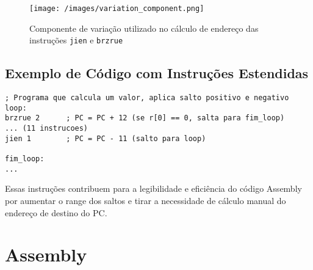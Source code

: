 \documentclass[12pt]{article}
\begin{document}
\begin{figure}[H]
\centering
\texttt{[image: /images/variation\_component.png]}
\caption{Componente de variação utilizado no cálculo de endereço das instruções \texttt{jien} e \texttt{brzrue}}
\label{fig:variation}
\end{figure}

\subsection{Exemplo de Código com Instruções Estendidas}

\begin{lstlisting}
; Programa que calcula um valor, aplica salto positivo e negativo
loop:
brzrue 2      ; PC = PC + 12 (se r[0] == 0, salta para fim_loop)
... (11 instrucoes)
jien 1        ; PC = PC - 11 (salto para loop)

fim_loop:
...
\end{lstlisting}

Essas instruções contribuem para a legibilidade e eficiência do código Assembly por aumentar o range dos saltos e tirar a necessidade de cálculo manual do endereço de destino do PC.

\section{Assembly}
\end{document}
